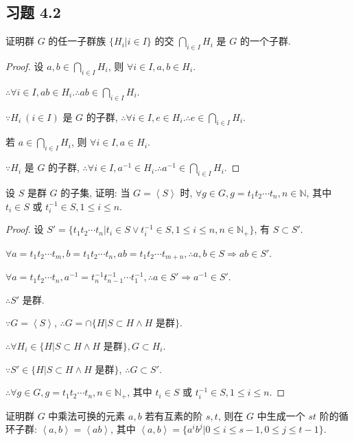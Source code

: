\documentclass[color=black,device=normal,lang=cn,mode=geye]{elegantnote}
\begin{document}
\subsection{习题 4.2}
\begin{exercise}%
    证明群 $G$ 的任一子群族 $\{H_i|i\in I\}$ 的交 $\bigcap\limits_{i\in I}H_i$ 是 $G$ 的一个子群.
\end{exercise}
\begin{proof}
    设 $a,b\in\bigcap\limits_{i\in I}H_i$, 则 $\forall i\in I,a,b\in H_i$.

    $\therefore\forall i\in I,ab\in H_i.\therefore ab\in\bigcap\limits_{i\in I}H_i$.

    $\because H_i\ (i\in I)$ 是 $G$ 的子群, $\therefore\forall i\in I,e\in H_i.\therefore e\in\bigcap\limits_{i\in I}H_i$.

    若 $a\in\bigcap\limits_{i\in I}H_i$, 则 $\forall i\in I,a\in H_i$.

    $\because H_i$ 是 $G$ 的子群, $\therefore\forall i\in I,a^{-1}\in H_i.\therefore a^{-1}\in\bigcap\limits_{i\in I}H_i$.
\end{proof}
\begin{exercise}\label{ex2.2}
    设 $S$ 是群 $G$ 的子集, 证明: 当 $G=\left<S\right>$ 时, $\forall g\in G,g=t_1t_2\cdots t_n,n\in\mathbb{N}$, 其中 $t_i\in S$ 或 $t_i^{-1}\in S, 1\leq i\leq n$.
\end{exercise}
\begin{proof}
    设 $S'=\{t_1t_2\cdots t_n|t_i\in S\vee t_i^{-1}\in S,1\leq i\leq n,n\in\mathbb{N}_+\}$, 有 $S\subset S'$.

    $\forall a=t_1t_2\cdots t_m,b=t_1t_2\cdots t_n,ab=t_1t_2\cdots t_{m+n},\therefore a,b\in S\Rightarrow ab\in S'$.

    $\forall a=t_1t_2\cdots t_n,a^{-1}=t_n^{-1}t_{n-1}^{-1}\cdots t_1^{-1},\therefore a\in S'\Rightarrow a^{-1}\in S'$.

    $\therefore S'$ 是群.

    $\because G=\left<S\right>$, $\therefore G=\cap\{H|S\subset H\land H$ 是群$\}$.

    $\therefore\forall H_i\in\{H|S\subset H\land H$ 是群$\},G\subset H_i$.

    $\because S'\in\{H|S\subset H\land H$ 是群$\}$, $\therefore G\subset S'$.

    $\therefore\forall g\in G,g=t_1t_2\cdots t_n,n\in\mathbb{N}_+$, 其中 $t_i\in S$ 或 $t_i^{-1}\in S, 1\leq i\leq n$.
\end{proof}
\begin{exercise}%
    证明群 $G$ 中乘法可换的元素 $a,b$ 若有互素的阶 $s,t$, 则在 $G$ 中生成一个 $st$ 阶的循环子群: $\left<a,b\right>=\left<ab\right>$, 其中 $\left<a,b\right>=\{a^ib^j|0\leq i\leq s-1,0\leq j\leq t-1\}$.
\end{exercise}
\end{document}

